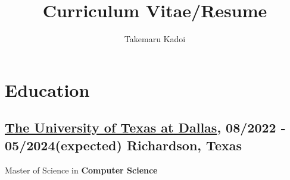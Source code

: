 \documentclass[10pt]{article}
\title{\vspace{-1cm}Curriculum Vitae/Resume}
\author{Takemaru Kadoi}
\date{}
\begin{document}
\section*{Education}
  \subsection*{\underline{The University of Texas at Dallas}, 08/2022 - 05/2024(expected) \hfill Richardson, Texas}
    Master of Science in \textbf{Computer Science}
\end{document}
